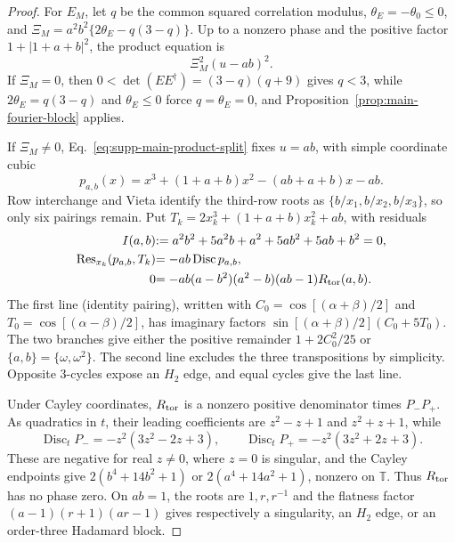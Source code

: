 \documentclass[aps,prx,reprint,nofootinbib,twoside,superscriptaddress,longbibliography,floatfix]{revtex4-2}
\theoremstyle{definition}
\newcommand{\T}{\mathbb T}
\begin{document}
\begin{proof}
{For $E_M$, let $q$ be the common squared correlation modulus, $\theta_E=-\theta_0\le0$, and $\Xi_M=a^2b^2\{2\theta_E-q(3-q)\}$.  Up to a nonzero phase and the positive factor $1+|1+a+b|^2$, the product equation is}
\begin{equation}
{\Xi_M^2(u-ab)^2.}
\label{eq:supp-main-product-split}
\end{equation}
{If $\Xi_M=0$, then $0<\det(EE^\dagger)=(3-q)(q+9)$ gives $q<3$, while $2\theta_E=q(3-q)$ and $\theta_E\le0$ force $q=\theta_E=0$, and Proposition~\ref{prop:main-fourier-block} applies.}

{If $\Xi_M\ne0$, Eq.~\eqref{eq:supp-main-product-split} fixes $u=ab$, with simple coordinate cubic}
\begin{equation}
{p_{a,b}(x)=x^3+(1+a+b)x^2-(ab+a+b)x-ab.}
\label{eq:supp-main-coordinate-cubic}
\end{equation}
{Row interchange and Vieta identify the third-row roots as $\{b/x_1,b/x_2,b/x_3\}$, so only six pairings remain. Put $T_k=2x_k^3+(1+a+b)x_k^2+ab$, with residuals}
\begin{align}
{I(a,b)}&{:=a^2b^2+5a^2b+a^2+5ab^2+5ab+b^2=0,}
\label{eq:supp-main-identity-pairing}
\\
{\operatorname{Res}_{x_k}(p_{a,b},T_k)}&{=-ab\operatorname{Disc}p_{a,b},}
\\
{0}&{=-ab(a-b^2)(a^2-b)(ab-1)R_{\rm tor}(a,b).}
\label{eq:supp-main-pairing-resultant}
\end{align}
{The first line (identity pairing), written with $C_0=\cos[(\alpha+\beta)/2]$ and $T_0=\cos[(\alpha-\beta)/2]$, has imaginary factors $\sin[(\alpha+\beta)/2](C_0+5T_0)$. The two branches give either the positive remainder $1+2C_0^2/25$ or $\{a,b\}=\{\omega,\omega^2\}$.  The second line excludes the three transpositions by simplicity. Opposite $3$-cycles expose an $H_2$ edge, and equal cycles give the last line.}

{Under Cayley coordinates, $R_{\rm tor}$ is a nonzero positive denominator times $P_-P_+$. As quadratics in $t$, their leading coefficients are $z^2-z+1$ and $z^2+z+1$, while}
\begin{equation}
{\operatorname{Disc}_tP_-= -z^2(3z^2-2z+3),
\qquad
\operatorname{Disc}_tP_+= -z^2(3z^2+2z+3).}
\end{equation}
{These are negative for real $z\ne0$, where $z=0$ is singular, and the Cayley endpoints give $2(b^4+14b^2+1)$ or $2(a^4+14a^2+1)$, nonzero on $\T$. Thus $R_{\rm tor}$ has no phase zero.  On $ab=1$, the roots are $1,r,r^{-1}$ and the flatness factor $(a-1)(r+1)(ar-1)$ gives respectively a singularity, an $H_2$ edge, or an order-three Hadamard block.}


\end{proof}
\end{document}
